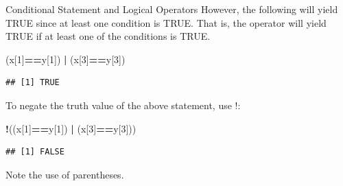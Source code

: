 \documentclass[
  ignorenonframetext,
]{beamer}
\newenvironment{Shaded}{\begin{snugshade}}{\end{snugshade}}
\newcommand{\DecValTok}[1]{\textcolor[rgb]{0.00,0.00,0.81}{#1}}
\newcommand{\NormalTok}[1]{#1}
\newcommand{\SpecialCharTok}[1]{\textcolor[rgb]{0.81,0.36,0.00}{\textbf{#1}}}
\begin{document}
\begin{frame}[fragile]{Conditional Statement and Logical Operators}
\protect\hypertarget{conditional-statement-and-logical-operators-1}{}
However, the following will yield TRUE since at least one condition is
TRUE. That is, the \textbar{} operator will yield TRUE if at least one
of the conditions is TRUE.

\small

\begin{Shaded}
\begin{Highlighting}[]
\NormalTok{(x[}\DecValTok{1}\NormalTok{]}\SpecialCharTok{==}\NormalTok{y[}\DecValTok{1}\NormalTok{]) }\SpecialCharTok{|}\NormalTok{ (x[}\DecValTok{3}\NormalTok{]}\SpecialCharTok{==}\NormalTok{y[}\DecValTok{3}\NormalTok{])}
\end{Highlighting}
\end{Shaded}

\begin{verbatim}
## [1] TRUE
\end{verbatim}

\normalsize

To negate the truth value of the above statement, use !:

\small

\begin{Shaded}
\begin{Highlighting}[]
\SpecialCharTok{!}\NormalTok{((x[}\DecValTok{1}\NormalTok{]}\SpecialCharTok{==}\NormalTok{y[}\DecValTok{1}\NormalTok{]) }\SpecialCharTok{|}\NormalTok{ (x[}\DecValTok{3}\NormalTok{]}\SpecialCharTok{==}\NormalTok{y[}\DecValTok{3}\NormalTok{]))}
\end{Highlighting}
\end{Shaded}

\begin{verbatim}
## [1] FALSE
\end{verbatim}

\normalsize

Note the use of parentheses.
\end{frame}
\end{document}
